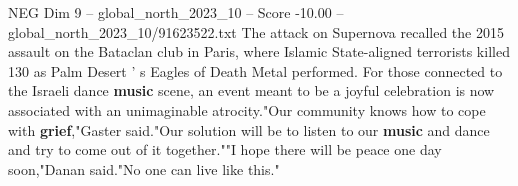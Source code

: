 \begin{textsample}{NEG Dim 9 – global\_north\_2023\_10 – Score -10.00 – global\_north\_2023\_10/91623522.txt}
The attack on Supernova recalled the 2015 assault on the Bataclan club in Paris, where Islamic State-aligned terrorists killed 130 as Palm Desert ' s Eagles of Death Metal performed.
For those connected to the Israeli dance \textbf{music} scene, an event meant to be a joyful celebration is now associated with an unimaginable atrocity."Our community knows how to cope with \textbf{grief},"Gaster said."Our solution will be to listen to our \textbf{music} and dance and try to come out of it together.""I hope there will be peace one day soon,"Danan said."No one can live like this."

\end{textsample}
